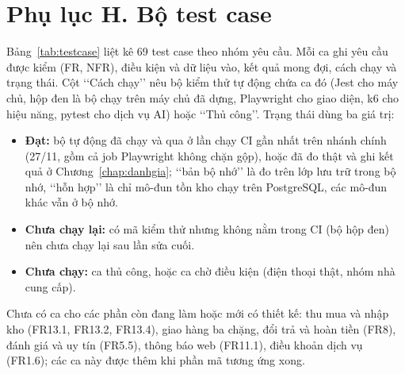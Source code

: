 
\section*{Phụ lục H. Bộ test case}
\label{apdx:testcase}

Bảng~\ref{tab:testcase} liệt kê 69 test case theo nhóm yêu cầu. Mỗi ca ghi yêu cầu được kiểm (FR, NFR), điều kiện và dữ liệu vào, kết quả mong đợi, cách chạy và trạng thái. Cột \lq\lq Cách chạy\rq\rq{} nêu bộ kiểm thử tự động chứa ca đó (Jest cho máy chủ, hộp đen là bộ chạy trên máy chủ đã dựng, Playwright cho giao diện, k6 cho hiệu năng, pytest cho dịch vụ AI) hoặc \lq\lq Thủ công\rq\rq. Trạng thái dùng ba giá trị:
\begin{itemize}
    \item \textbf{Đạt:} bộ tự động đã chạy và qua ở lần chạy CI gần nhất trên nhánh chính (27/11, gồm cả job Playwright không chặn gộp), hoặc đã đo thật và ghi kết quả ở Chương~\ref{chap:danhgia}; \lq\lq bản bộ nhớ\rq\rq{} là đo trên lớp lưu trữ trong bộ nhớ, \lq\lq hỗn hợp\rq\rq{} là chỉ mô-đun tồn kho chạy trên PostgreSQL, các mô-đun khác vẫn ở bộ nhớ.
    \item \textbf{Chưa chạy lại:} có mã kiểm thử nhưng không nằm trong CI (bộ hộp đen) nên chưa chạy lại sau lần sửa cuối.
    \item \textbf{Chưa chạy:} ca thủ công, hoặc ca chờ điều kiện (điện thoại thật, nhóm nhà cung cấp).
\end{itemize}
Chưa có ca cho các phần còn đang làm hoặc mới có thiết kế: thu mua và nhập kho (FR13.1, FR13.2, FR13.4), giao hàng ba chặng, đổi trả và hoàn tiền (FR8), đánh giá và uy tín (FR5.5), thông báo web (FR11.1), điều khoản dịch vụ (FR1.6); các ca này được thêm khi phần mã tương ứng xong.

